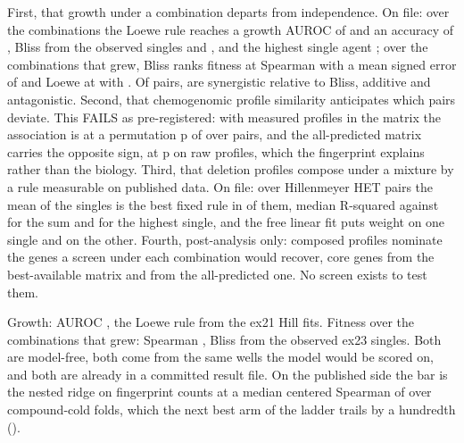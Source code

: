  First, that growth under a
combination departs from independence. On file: over the \hydnCombinations{} combinations
the Loewe rule reaches a growth AUROC of \hydloeweAuroc{} and an accuracy of
\hydloeweAccuracy{}, Bliss from the observed singles \hydblissAuroc{} and
\hydblissAccuracy{}, and the highest single agent \hydhsaAuroc{}; over the
\hydnGrewServed{} combinations that grew, Bliss ranks fitness at Spearman
\hydblissSpearman{} with a mean signed error of \hydblissSignedError{} and Loewe at
\hydloeweSpearman{} with \hydloeweSignedError{}. Of \hydnPairs{} pairs,
\hydnPairsSynergy{} are synergistic relative to Bliss, \hydnPairsAdditive{} additive and
\hydnPairsAntagonism{} antagonistic. Second, that chemogenomic profile similarity
anticipates which pairs deviate. This FAILS as pre-registered: with measured profiles in
the matrix the association is \hydsvdBestSpearman{} at a permutation p of
\hydsvdBestP{} over \hydsvdBestPairs{} pairs, and the all-predicted matrix carries the
opposite sign, \hydsvdPredRawSpearman{} at p \hydsvdPredRawP{} on raw profiles, which the
fingerprint explains rather than the biology. Third, that deletion profiles compose under
a mixture by a rule measurable on published data. On file: over \hydhetPairs{} Hillenmeyer
HET pairs the mean of the singles is the best fixed rule in \hydhetMeanWins{} of them,
median R-squared \hydhetrTwomean{} against \hydhetrTwosum{} for the sum and
\hydhetrTwomax{} for the highest single, and the free linear fit puts weight
\hydhetLinA{} on one single and \hydhetLinB{} on the other. Fourth, post-analysis only:
composed profiles nominate the genes a screen under each combination would recover,
\hydnomCoreBest{} core genes from the best-available matrix and \hydnomCorePredicted{}
from the all-predicted one. No screen exists to test them.

 Growth: AUROC \hydloeweAuroc{}, the Loewe rule
from the ex21 Hill fits. Fitness over the combinations that grew: Spearman
\hydblissSpearman{}, Bliss from the observed ex23 singles. Both are model-free, both come
from the same wells the model would be scored on, and both are already in a committed
result file. On the published side the bar is the nested ridge on fingerprint counts at a
median centered Spearman of \hydladderRidge{} over \hydladderCompounds{} compound-cold
folds, which the next best arm of the ladder trails by a hundredth
(\hydladderSecond{}).

